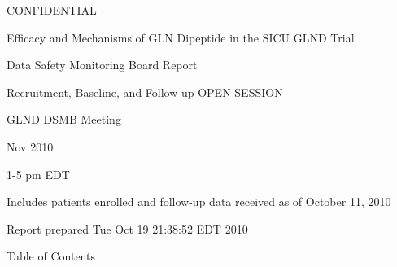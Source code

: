 \documentclass[dvips,10pt]{article}
\begin{document}
\vspace*{1in}
\begin{center}
{\Huge{CONFIDENTIAL}}
\end{center}
\vspace*{0.5in}
\begin{center}
{\Huge{Efficacy and Mechanisms of GLN Dipeptide in the SICU GLND Trial}}
\end{center}
\vspace*{0.5in}
\begin{center}
{\Huge{Data Safety Monitoring Board Report}}
\end{center}
\vspace*{0.25in}
\begin{center}
{\Huge{
Recruitment, Baseline, and Follow-up  OPEN SESSION
}}
\end{center}
\vspace*{1in}
\begin{center}
{\Huge{GLND DSMB Meeting}}
\end{center}
\begin{center}
{\Huge{
 Nov 2010
}}
\end{center}
\begin{center}
{\Huge{1-5 pm EDT}}
\end{center}
\vspace*{1in}
\begin{center}
\noindent
{\Large{Includes patients enrolled and follow-up data received as of October 11, 2010}}
\end{center}
\vspace*{0.5in}
\begin{center}
{\Large{Report prepared  Tue Oct 19 21:38:52 EDT 2010 }}
\end{center}
\clearpage
\vspace*{1in}
\begin{center}
{\Huge{Table of Contents}}
\end{center}
\listoftables
\listoffigures
\clearpage
\clearpage
\end{document}

